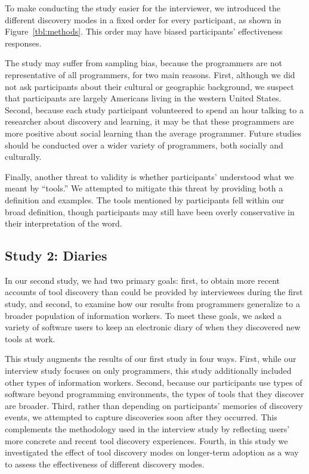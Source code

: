 \documentclass[smallextended]{svjour3}
\newcommand\contexts{modes\xspace}
\begin{document}
To make conducting the study easier for the interviewer, we introduced the
different discovery \contexts in a fixed order for every participant, as shown in
Figure~\ref{tbl:methods}. 
This order may have biased participants' effectiveness responses. 

The study may suffer from sampling bias, because the programmers are 
not representative of all programmers, for two main reasons. 
First, although we did not ask participants about their cultural or geographic background, 
we suspect that participants are largely Americans living in the western United States. 
Second, because each study participant volunteered to spend an hour talking to a researcher about discovery and
learning, it may be that these programmers are more positive
about social learning than the average programmer. Future
studies should be conducted over a wider variety of programmers, both socially and culturally.

Finally, another threat to validity is whether participants' understood
what we meant by ``tools.''
We attempted to mitigate this threat by providing both a definition and
examples.
The tools mentioned by participants fell within
our broad definition, though participants may still have been
overly conservative in their interpretation of the word.

\subsection{Study 2: Diaries}\label{sec:thesecondstudy}

\noindent
In our second study, we had two primary goals: 
first, to obtain more recent accounts of tool discovery
than could be provided by interviewees during the first study, and
second, to examine how our results from programmers 
generalize to a broader population of information workers.
To meet these goals, we asked a variety of
software users to keep an electronic diary of when
they discovered new tools at work.

This study augments the results of our first study in four ways. 
First, while our interview study focuses on only programmers, 
this study additionally included other types of 
information workers.
Second, because our participants use types of software beyond programming environments,
the types of tools that they discover are broader.
Third, rather than depending on participants' memories of discovery events,
we attempted to capture discoveries soon after they occurred.  
This complements the methodology used in the interview study by reflecting users' more concrete 
and recent tool discovery experiences.
Fourth, in this study we investigated the effect of tool discovery modes
on longer-term adoption as a way to assess the effectiveness of different discovery modes.
\end{document}
